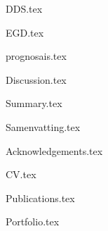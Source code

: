 \documentclass[10pt,twoside,openright]{memoir}
\begin{document}
{DDS.tex}
\clearemptydoublepage

{EGD.tex}
\clearemptydoublepage


{prognosais.tex}
\clearemptydoublepage

{Discussion.tex}
\clearemptydoublepage

\backmatter
\thumbfalse
{Summary.tex}
\clearemptydoublepage

{Samenvatting.tex}
\clearemptydoublepage

{Acknowledgements.tex}
\clearemptydoublepage

{CV.tex}
\clearemptydoublepage

{Publications.tex}
\clearemptydoublepage

{Portfolio.tex}
\clearemptydoublepage

\printglossary[type=main]
\printglossary[type=\acronymtype]
\clearemptydoublepage

\newrefcontext[sorting=none]
\printbibliography[heading=bibintoc]
\end{document}
